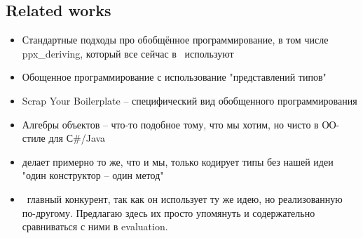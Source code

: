 \subsection{Related works}
\begin{itemize}
\item  Стандартные подходы про обобщённое программирование, в том числе ppx\_deriving, который все сейчас в \ocaml~используют
\item Обощенное программирование с использование "представлений типов"
\item Scrap Your Boilerplate -- специфический вид обобщенного программирования
\item Алгебры объектов -- что-то подобное тому, что мы хотим, но чисто в ОО-стиле для С\#/Java
\item {} делает примерно то же, что и мы, только кодирует типы без  нашей идеи "один конструктор -- один метод"
\item \visitors~главный конкурент, так как он использует ту же идею, но реализованную по-другому. Предлагаю здесь их просто упомянуть и содержательно сравниваться с ними в evaluation.
\end{itemize}

